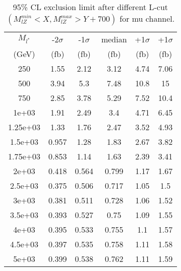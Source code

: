 \documentclass[]{article}
\begin{document}
\begin{table}
\begin{center}
\begin{tabular}{cccccc}
\hline 
\hline 
$M_{l^*}$ & -2$\sigma$ & -1$\sigma$ & median & +1$\sigma$ & +1$\sigma$\\ 
(GeV) & (fb) & (fb) & (fb) & (fb) & (fb)  \\ 
\hline 
\hline 
250 & 1.55 & 2.12 & 3.12 & 4.74 & 7.06\\
500 & 3.94 & 5.3 & 7.48 & 10.8 & 15\\
750 & 2.85 & 3.78 & 5.29 & 7.52 & 10.4\\
1e+03 & 1.91 & 2.49 & 3.4 & 4.71 & 6.45\\
1.25e+03 & 1.33 & 1.76 & 2.47 & 3.52 & 4.93\\
1.5e+03 & 0.957 & 1.28 & 1.83 & 2.67 & 3.82\\
1.75e+03 & 0.853 & 1.14 & 1.63 & 2.39 & 3.41\\
2e+03 & 0.418 & 0.564 & 0.799 & 1.17 & 1.67\\
2.5e+03 & 0.375 & 0.506 & 0.717 & 1.05 & 1.5\\
3e+03 & 0.381 & 0.511 & 0.728 & 1.06 & 1.52\\
3.5e+03 & 0.393 & 0.527 & 0.75 & 1.09 & 1.55\\
4e+03 & 0.395 & 0.533 & 0.755 & 1.1 & 1.57\\
4.5e+03 & 0.397 & 0.535 & 0.758 & 1.11 & 1.58\\
5e+03 & 0.399 & 0.538 & 0.762 & 1.11 & 1.59\\
\hline 
\end{tabular}
\caption{95\% CL exclusion limit after different L-cut $(M_{lZ}^{min} < X, M_{lZ}^{max} > Y + 700)$ for mu channel.}
\label{tab:limit_muon}
\end{center}
\end{table}
\end{document}
